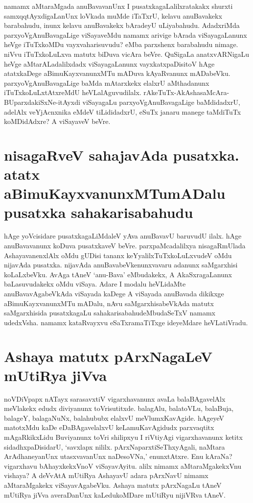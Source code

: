namamx aMtaraMgada anuBavavanUnx I pusatxkagaLalilxratakakx shurxti samxqqtAyxdigaLanUnx loVkada muMde iTaTxrU, kelavu anuBavakekx barabahudu, inunx kelavu anuBavakekx bAradeyU uLiyabahudu. AdadxriMda parxyoVgAnuBavagaLige viSayaveMdu namamx arivige bArada viSayagaLanunx heVge iTuTxkoMDu vayxvaharisuvudu? eMba parxshenx barabahudu nimage. niVvu iTuTxkoLuLxva matutx biDuva vicAra beVre. QuSigaLa anatxvARNigaLu heVge aMtarALadalilxdadx viSayagaLanunx  vayxkatxpaDisitoV hAge atatxkaDege aBimuKayxvanunxMTu mADuva kAyaRvanunx mADabeVku. parxyoVgAnuBavagaLige baMda mAtarxkekx elalxrU aMthadanunx iTuTxkoLuLxtAtxreMdU heVLalAguvudilalx. rAkeTuTx-AkAshasaMcAra-BUparxdakiSxNe-itAyxdi viSayagaLu parxyoVgAnuBavagaLige baMdidadxrU, adelAlx veYjAcnxnika eMdeV tiLididadxrU, eSuTx janaru manege taMdiTuTx koMDidAdxre? A viSayaveV beVre.

\section*{nisagaRveV sahajavAda pusatxka. atatx aBimuKayxvanunxMTumADalu pusatxka sahakarisabahudu}

hAge yoVcisidare pusatxkagaLiMdaleV yAva anuBavavU baruvudU ilalx. hAge anuBavavanunx koDuva pusatxkaveV beVre. parxpaMcadalilxya nisagaRmUlada AshayavanenxlAlx oMdu gUDisi tananx keYyalilxTuTxkoLuLxvudeV  oMdu nijavAda pusatxka. nijavAda anuBavabeVkenunxvavaru adanunx saMgarxhisi koLaLxbeVku. AvAga tAneV `anu-Bava' eMbudakekx, A AkaSxragaLanunx baLasuvudakekx oMdu viSaya. Adare I modalu heVLidaMte anuBavavAgabeVkAda viSayada kaDege A viSayada anuBavada dikikxge aBimuKayxvanunxMTu mADalu, nAvu saMgarxhisabeVkAda matutx saMgarxhisida pusatxkagaLu sahakarisabahudeMbudaSeTxV namamx udedxVsha. namamx kataRvayxvu eSaTxramaTiTxge ideyeMdare heVLatiVradu.

\section*{Ashaya matutx pArxNagaLeV mUtiRya jiVva}

noVDiVpapx nATayx sarasavxtiV vigarxhavanunx avaLa balaBAgavelAlx meVlakekx edudx diviyanunx toVrisutitxde. balagAlu, balatoVLu, balaBuja, balageY, balagaNuNx, balahububx elalxvU meVlumxKavAgide. hAgeyeV matotxMdu kaDe eDaBAgavelalxvU keLamuKavAgidudx parxvaqtitx mAgaRkikxLidu Buviyanunx toVri shilipxyu I riVtiyAgi vigarxhavanunx ketitx sidadhxpaDisidarU, `savxlapx nililx. pArxNaparxtiSeThxyAgali, naMtara ArAdhaneyanUnx utasxvavanUnx naDesoVNa,' enunxtAtxre. Enu kAraNa? vigarxhavu bAhayxkekxVnoV viSayavAyitu. alilx nimamx aMtaraMgakekxVnu vishaya? A deVvAtA mUtiRya AshayavU adara pArxNavU nimamx aMtaraMgakekx viSayavAgabeVku. Ashaya matutx pArxNagaLu tAneV mUtiRya jiVva averaDanUnx kaLedukoMDare mUtiRyu nijiVRva tAneV.

